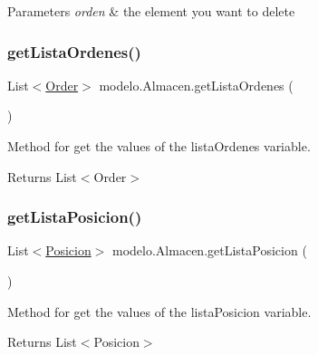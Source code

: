 \begin{DoxyParams}{Parameters}
{\em orden} & the element you want to delete \\
\hline
\end{DoxyParams}
\mbox{\label{classmodelo_1_1_almacen_ad87095e4794081d98d8e77935a54f311}} 
\subsubsection{\texorpdfstring{get\+Lista\+Ordenes()}{getListaOrdenes()}}
{\footnotesize\ttfamily List$<$\mbox{\hyperlink{classmodelo_1_1_order}{Order}}$>$ modelo.\+Almacen.\+get\+Lista\+Ordenes (\begin{DoxyParamCaption}{ }\end{DoxyParamCaption})}



Method for get the values of the lista\+Ordenes variable. 

\begin{DoxyReturn}{Returns}
List$<$\+Order$>$ 
\end{DoxyReturn}
\mbox{\label{classmodelo_1_1_almacen_a5f549eec4b4dec51453b913a0c00de53}} 
\subsubsection{\texorpdfstring{get\+Lista\+Posicion()}{getListaPosicion()}}
{\footnotesize\ttfamily List$<$\mbox{\hyperlink{classmodelo_1_1_posicion}{Posicion}}$>$ modelo.\+Almacen.\+get\+Lista\+Posicion (\begin{DoxyParamCaption}{ }\end{DoxyParamCaption})}



Method for get the values of the lista\+Posicion variable. 

\begin{DoxyReturn}{Returns}
List$<$\+Posicion$>$ 
\end{DoxyReturn}
\mbox{\label{classmodelo_1_1_almacen_ad20ed6c1d6abf54fcda8bb94b6900862}} 
